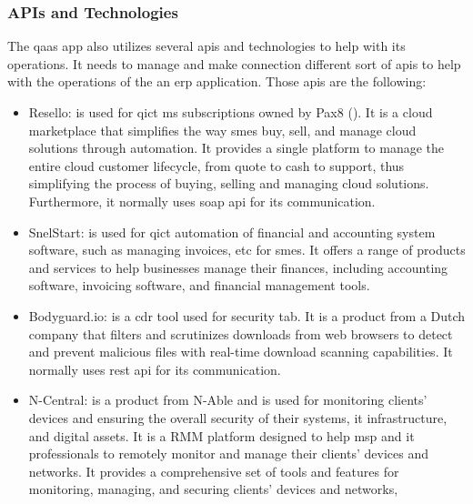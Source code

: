 \begin{multicols}{2}
      \subsubsection{APIs and Technologies}
      The \acrshort{qaas} app also utilizes several \acrshort{api}s and technologies to help with its operations.
      It needs to manage and make connection different sort of \acrshort{api}s to help with the operations of the
      an \acrshort{erp} application. Those \acrshort{api}s are the following:
      \begin{itemize}
            \item Resello: is used for \acrshort{qict} \acrshort{ms} subscriptions owned by Pax8 (\textit{\cite{resello}}).
                  It is a cloud marketplace that simplifies the way \acrshort{sme}s buy, sell, and manage cloud solutions
                  through automation. It provides a single platform to manage the entire cloud customer lifecycle, from
                  quote to cash to support, thus simplifying the process of buying, selling and managing cloud
                  solutions. Furthermore, it normally uses \acrshort{soap} \acrshort{api} for its communication.
            \item SnelStart: is used for \acrshort{qict} automation of financial and accounting system software,
                  such as managing invoices, \acrshort{etc} for \acrshort{sme}s. It offers a range of products and
                  services to help businesses manage their finances, including accounting software, invoicing software,
                  and financial management tools.
            \item Bodyguard.io: is a \acrshort{cdr} tool used for security tab. It is a product from a Dutch company
                  that filters and scrutinizes downloads from web browsers to detect and prevent malicious files with
                  real-time download scanning capabilities. It normally uses \acrshort{rest} \acrshort{api} for its
                  communication.
            \item N-Central: is a product from N-Able and is used for monitoring clients' devices and ensuring the
                  overall security of their systems, \acrshort{it} infrastructure, and digital assets. It is a
                  \gls{RMM} platform designed to help \acrshort{msp} and \acrshort{it} professionals to
                  remotely monitor and manage their clients' devices and networks. It provides a comprehensive
                  set of tools and features for monitoring, managing, and securing clients' devices and networks,

\end{itemize}
\end{multicols}
